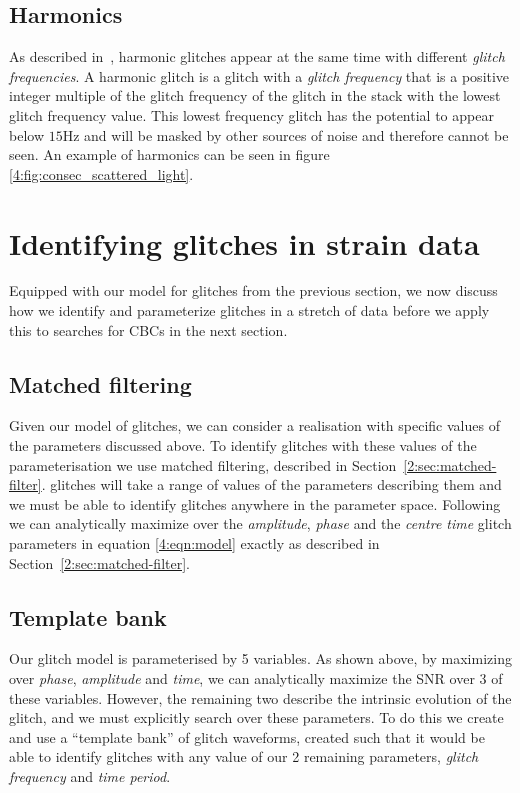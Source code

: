 \subsection{Harmonics}

As described in~\cite{TAccadia:2010}, harmonic glitches appear at the same time with different \emph{glitch frequencies}. A harmonic glitch is a glitch with a \emph{glitch frequency} that is a positive integer multiple of the glitch frequency of the glitch in the stack with the lowest glitch frequency value. This lowest frequency glitch has the potential to appear below $15$Hz and will be masked by other sources of noise and therefore cannot be seen. An example of harmonics can be seen in figure \ref{4:fig:consec_scattered_light}.

\section{\label{4:sec:search_techniques}Identifying \scladj glitches in \gwadj strain data}

Equipped with our model for \scladj glitches from the previous section, we now discuss how we identify and parameterize \scladj glitches in a stretch of \gwadj data before we apply this to searches for CBCs in the next section. 

\subsection{\label{4:subsec:MF}Matched filtering}

Given our model of \scladj glitches, we can consider a realisation with specific values of the parameters discussed above. To identify glitches with these values of the parameterisation we use matched filtering, described in Section~\ref{2:sec:matched-filter}. \Scladj glitches will take a range of values of the parameters describing them and we must be able to identify glitches anywhere in the parameter space. Following~\cite{FINDCHIRP:2012} we can analytically maximize over the \emph{amplitude}, \emph{phase} and the \emph{centre time} glitch parameters in equation \ref{4:eqn:model} exactly as described in Section~\ref{2:sec:matched-filter}.

\subsection{Template bank}

Our \scladj glitch model is parameterised by 5 variables. As shown above, by maximizing over \emph{phase}, \emph{amplitude} and \emph{time}, we can analytically maximize the SNR over 3 of these variables. However, the remaining two describe the intrinsic evolution of the glitch, and we must explicitly search over these parameters. To do this we create and use a ``template bank'' of \scladj glitch waveforms, created such that it would be able to identify glitches with any value of our 2 remaining parameters, \emph{glitch frequency} and \emph{time period}.

